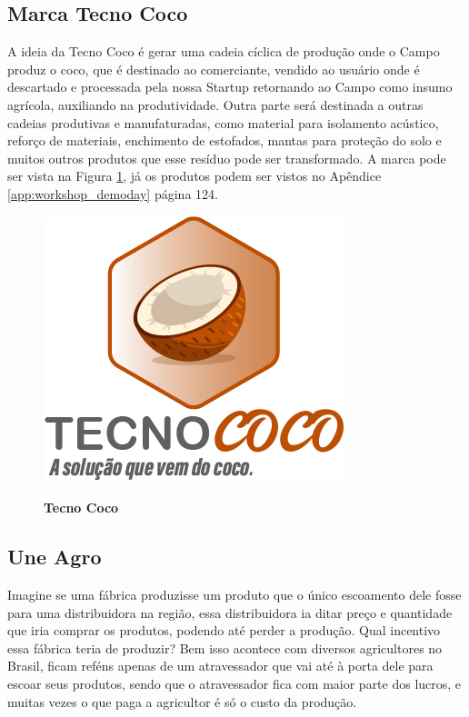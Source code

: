 \subsection{Marca Tecno Coco}

A ideia da Tecno Coco é gerar uma cadeia cíclica de produção onde o Campo produz o coco, que é destinado ao comerciante, vendido ao usuário onde é descartado e processada pela nossa Startup retornando ao Campo como insumo agrícola, auxiliando na produtividade. Outra parte será destinada a outras cadeias produtivas e manufaturadas, como material para isolamento acústico, reforço de materiais, enchimento de estofados, mantas para proteção do solo e muitos outros produtos que esse resíduo pode ser transformado. A marca pode ser vista na Figura \ref{tecno_coco}, já os produtos podem ser vistos no Apêndice \ref{app:workshop_demoday} página 124.


\begin{figure}[H]
\centering
\caption{\textbf{Tecno Coco}}
\includegraphics[scale=2]{Imagens/tecnococo.png}
\label{tecno_coco}
\end{figure}


\subsection{Une Agro}

Imagine se uma fábrica produzisse um produto que o único escoamento dele fosse para uma distribuidora na região, essa distribuidora ia ditar preço e quantidade que iria comprar os produtos, podendo até perder a produção. Qual incentivo essa fábrica teria de produzir? Bem isso acontece com diversos agricultores no Brasil, ficam reféns apenas de um atravessador que vai até à porta dele para escoar seus produtos, sendo que o atravessador fica com maior parte dos lucros, e muitas vezes o que paga a agricultor é só o custo da produção.

